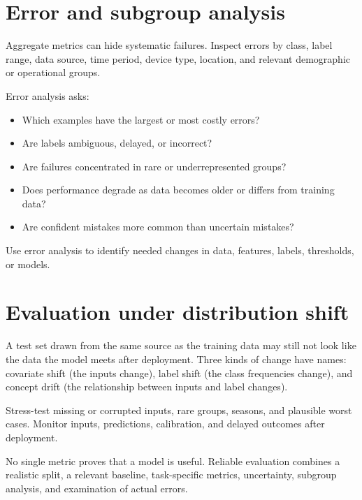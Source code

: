 \section{Error and subgroup analysis}

Aggregate metrics can hide systematic failures. Inspect errors by class, label range, data source, time period, device type, location, and relevant demographic or operational groups.

Error analysis asks:

\begin{itemize}
  \item Which examples have the largest or most costly errors?
  \item Are labels ambiguous, delayed, or incorrect?
  \item Are failures concentrated in rare or underrepresented groups?
  \item Does performance degrade as data becomes older or differs from training data?
  \item Are confident mistakes more common than uncertain mistakes?
\end{itemize}

Use error analysis to identify needed changes in data, features, labels, thresholds, or models.

\section{Evaluation under distribution shift}

A test set drawn from the same source as the training data may still not look like the data the model meets after deployment. Three kinds of change have names: covariate shift (the inputs change), label shift (the class frequencies change), and concept drift (the relationship between inputs and label changes).

Stress-test missing or corrupted inputs, rare groups, seasons, and plausible worst cases. Monitor inputs, predictions, calibration, and delayed outcomes after deployment.

\begin{keyidea}
No single metric proves that a model is useful. Reliable evaluation combines a realistic split, a relevant baseline, task-specific metrics, uncertainty, subgroup analysis, and examination of actual errors.
\end{keyidea}

